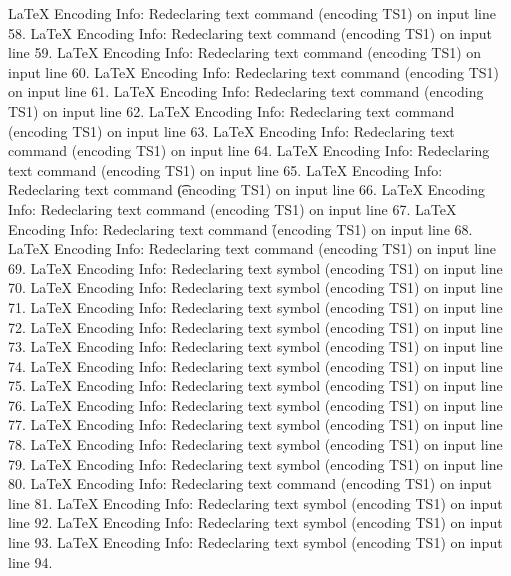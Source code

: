 LaTeX Encoding Info:    Redeclaring text command \capitaltilde (encoding TS1) on input line 58.
LaTeX Encoding Info:    Redeclaring text command \capitaldieresis (encoding TS1) on input line 59.
LaTeX Encoding Info:    Redeclaring text command \capitalhungarumlaut (encoding TS1) on input line 60.
LaTeX Encoding Info:    Redeclaring text command \capitalring (encoding TS1) on input line 61.
LaTeX Encoding Info:    Redeclaring text command \capitalcaron (encoding TS1) on input line 62.
LaTeX Encoding Info:    Redeclaring text command \capitalbreve (encoding TS1) on input line 63.
LaTeX Encoding Info:    Redeclaring text command \capitalmacron (encoding TS1) on input line 64.
LaTeX Encoding Info:    Redeclaring text command \capitaldotaccent (encoding TS1) on input line 65.
LaTeX Encoding Info:    Redeclaring text command \t (encoding TS1) on input line 66.
LaTeX Encoding Info:    Redeclaring text command \capitaltie (encoding TS1) on input line 67.
LaTeX Encoding Info:    Redeclaring text command \newtie (encoding TS1) on input line 68.
LaTeX Encoding Info:    Redeclaring text command \capitalnewtie (encoding TS1) on input line 69.
LaTeX Encoding Info:    Redeclaring text symbol \textcapitalcompwordmark (encoding TS1) on input line 70.
LaTeX Encoding Info:    Redeclaring text symbol \textascendercompwordmark (encoding TS1) on input line 71.
LaTeX Encoding Info:    Redeclaring text symbol \textquotestraightbase (encoding TS1) on input line 72.
LaTeX Encoding Info:    Redeclaring text symbol \textquotestraightdblbase (encoding TS1) on input line 73.
LaTeX Encoding Info:    Redeclaring text symbol \texttwelveudash (encoding TS1) on input line 74.
LaTeX Encoding Info:    Redeclaring text symbol \textthreequartersemdash (encoding TS1) on input line 75.
LaTeX Encoding Info:    Redeclaring text symbol \textleftarrow (encoding TS1) on input line 76.
LaTeX Encoding Info:    Redeclaring text symbol \textrightarrow (encoding TS1) on input line 77.
LaTeX Encoding Info:    Redeclaring text symbol \textblank (encoding TS1) on input line 78.
LaTeX Encoding Info:    Redeclaring text symbol \textdollar (encoding TS1) on input line 79.
LaTeX Encoding Info:    Redeclaring text symbol \textquotesingle (encoding TS1) on input line 80.
LaTeX Encoding Info:    Redeclaring text command \textasteriskcentered (encoding TS1) on input line 81.
LaTeX Encoding Info:    Redeclaring text symbol \textdblhyphen (encoding TS1) on input line 92.
LaTeX Encoding Info:    Redeclaring text symbol \textfractionsolidus (encoding TS1) on input line 93.
LaTeX Encoding Info:    Redeclaring text symbol \textzerooldstyle (encoding TS1) on input line 94.
